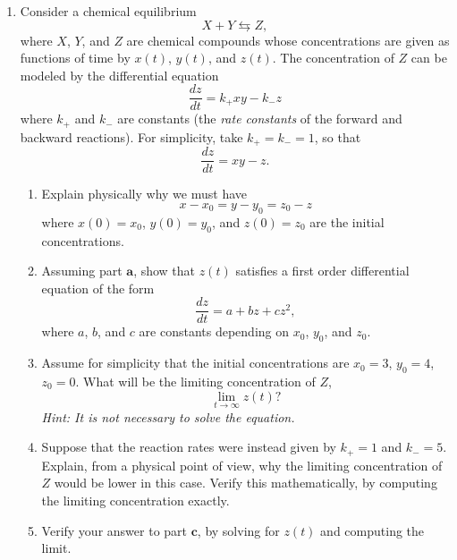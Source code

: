 \documentclass[10pt,psamsfonts,reqno,oneside,letterpaper]{amsart}
\begin{document}
\begin{enumerate}
	\item Consider a chemical equilibrium
	\[ X + Y \leftrightarrows Z , \]
	where $X$, $Y$, and $Z$ are chemical compounds whose concentrations are given as functions of time by $x(t)$, $y(t)$, and $z(t)$.  The concentration of $Z$ can be modeled by the differential equation
	\[ \frac{dz}{dt} = k_{+} xy  - k_{-} z  \]   
	where $k_{+}$ and $k_{-}$ are constants (the \emph{rate constants} of the forward and backward reactions). For simplicity, take $k_{+} = k_{-} = 1$, so that 
	\[ \frac{dz}{dt} = xy  - z.  \]
	\begin{enumerate}
		\item Explain physically why we must have 
		\[ x - x_0 = y-y_0 = z_0 - z \]
		where $x(0)=x_0$, $y(0)=y_0$, and $z(0)=z_0$ are the initial concentrations.  
		\item Assuming part $\textbf{a}$, show that $z(t)$ satisfies a first order differential equation of the form
		\[ \frac{dz}{dt} = a + bz + cz^2, \]
		where $a$, $b$, and $c$ are constants depending on $x_0$, $y_0$, and $z_0$.
		\item Assume for simplicity that the initial concentrations are $x_0 =3$, $y_0 = 4$, $z_0 = 0$. What will be the limiting concentration of $Z$, 
		\[ \lim_{t \to \infty} z(t) ?\]  
		\textit{Hint: It is not necessary to solve the equation.}
		\item Suppose that the reaction rates were instead given by $k_+ = 1$ and $k_- = 5$.  Explain, from a physical point of view, why the limiting concentration of $Z$ would be lower in this case.  Verify this mathematically, by computing the limiting concentration exactly. 
		\item Verify your answer to part $\textbf{c}$, by solving for $z(t)$ and computing the limit. 
		
	\end{enumerate}
	
		\end{enumerate}
	
\end{document}
